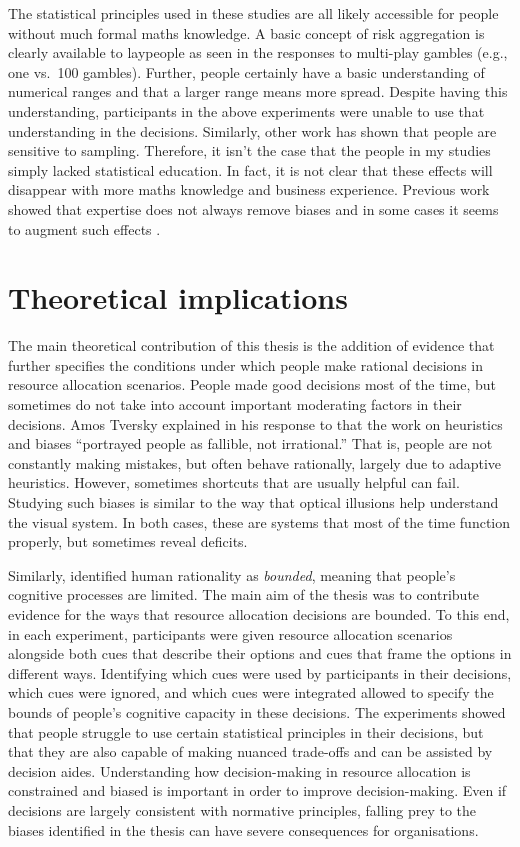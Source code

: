 \documentclass[a4paper, nobind, dvipsnames]{templates/ociamthesis}
\theoremstyle{definition}
\theoremstyle{definition}
\theoremstyle{definition}
\theoremstyle{definition}
\theoremstyle{remark}
\begin{document}
The statistical principles used in these studies are all likely accessible for
people without much formal maths knowledge. A basic concept of risk aggregation
is clearly available to laypeople as seen in the responses to multi-play gambles
(e.g., one vs.~100 gambles). Further, people certainly have a basic
understanding of numerical ranges and that a larger range means more spread.
Despite having this understanding, participants in the above experiments were
unable to use that understanding in the decisions. Similarly, other work has
shown that people are sensitive to sampling. Therefore, it isn't the case that
the people in my studies simply lacked statistical education. In fact, it is not
clear that these effects will disappear with more maths knowledge and business
experience. Previous work showed that expertise does not always remove biases
and in some cases it seems to augment such effects \autocite[e.g.,][]{haigh2005}.

\section{Theoretical implications}

The main theoretical contribution of this thesis is the addition of evidence
that further specifies the conditions under which people make rational decisions
in resource allocation scenarios. People made good decisions most of the time,
but sometimes do not take into account important moderating factors in their
decisions. Amos Tversky explained in his response to \textcite[p.~355]{cohen1981} that
the work on heuristics and biases ``portrayed people as fallible, not
irrational.'' That is, people are not constantly making mistakes, but often
behave rationally, largely due to adaptive heuristics. However, sometimes
shortcuts that are usually helpful can fail. Studying such biases is similar to
the way that optical illusions help understand the visual system. In both cases,
these are systems that most of the time function properly, but sometimes reveal
deficits.

Similarly, \textcite{simon1955} identified human rationality as \emph{bounded}, meaning that
people's cognitive processes are limited. The main aim of the thesis was to
contribute evidence for the ways that resource allocation decisions are bounded.
To this end, in each experiment, participants were given resource allocation
scenarios alongside both cues that describe their options and cues that frame
the options in different ways. Identifying which cues were used by participants
in their decisions, which cues were ignored, and which cues were integrated
allowed to specify the bounds of people's cognitive capacity in these decisions.
The experiments showed that people struggle to use certain statistical
principles in their decisions, but that they are also capable of making nuanced
trade-offs and can be assisted by decision aides. Understanding how
decision-making in resource allocation is constrained and biased is important in
order to improve decision-making. Even if decisions are largely consistent with
normative principles, falling prey to the biases identified in the thesis can
have severe consequences for organisations.
\end{document}
